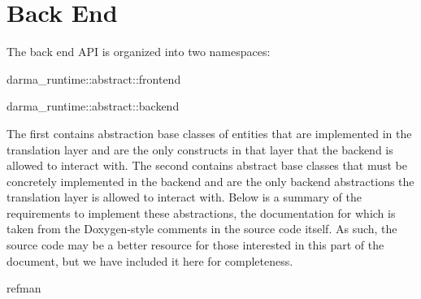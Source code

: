 
\chapter{Back End}
\label{chap:back_end}

The back end API is organized into two namespaces:
\begin{compactenum}
\item {\ttfamily darma\_runtime::abstract::frontend} 
\item {\ttfamily darma\_runtime::abstract::backend}  
\end{compactenum}

The first contains
abstraction base classes of entities that are implemented in the translation
layer and are the only constructs in that layer that the backend is
allowed to interact with.  The second contains abstract base classes that must be concretely implemented in the backend and
are the only backend abstractions the translation layer is allowed to interact
with.  Below is a summary of the requirements to implement these abstractions,
the documentation for which is taken from the Doxygen-style comments in
the source code itself.  As such, the source code may be a better resource for
those interested in this part of the document, but we have included it here for
completeness.  

{refman}
